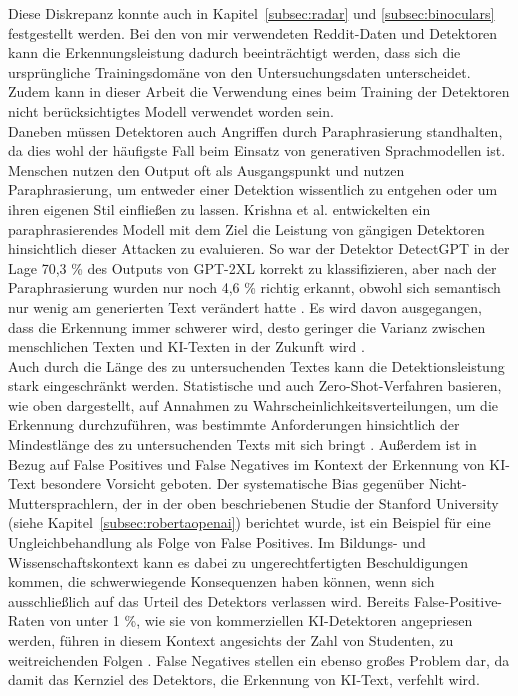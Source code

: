 Diese Diskrepanz konnte auch in Kapitel~\ref{subsec:radar} und \ref{subsec:binoculars} festgestellt werden. Bei den von mir verwendeten Reddit-Daten und Detektoren kann die Erkennungsleistung dadurch beeinträchtigt werden, dass sich die ursprüngliche Trainingsdomäne von den Untersuchungsdaten unterscheidet. Zudem kann in dieser Arbeit die Verwendung eines beim Training der Detektoren nicht berücksichtigtes Modell verwendet worden sein. \\
Daneben müssen Detektoren auch Angriffen durch Paraphrasierung standhalten, da dies wohl der häufigste Fall beim Einsatz von generativen Sprachmodellen ist. Menschen nutzen den Output oft als Ausgangspunkt und nutzen Paraphrasierung, um entweder einer Detektion wissentlich zu entgehen oder um ihren eigenen Stil einfließen zu lassen. Krishna et al. \autocite{krishna2023paraphrasingevadesdetectorsaigenerated} entwickelten ein paraphrasierendes Modell mit dem Ziel die Leistung von gängigen Detektoren hinsichtlich dieser Attacken zu evaluieren. So war der Detektor DetectGPT in der Lage 70,3 \% des Outputs von GPT-2XL korrekt zu klassifizieren, aber nach der Paraphrasierung wurden nur noch 4,6 \% richtig erkannt, obwohl sich semantisch nur wenig am generierten Text verändert hatte \autocite{krishna2023paraphrasingevadesdetectorsaigenerated}. Es wird davon ausgegangen, dass die Erkennung immer schwerer wird, desto geringer die Varianz zwischen menschlichen Texten und KI-Texten in der Zukunft wird \autocite{sadasivan2025aigeneratedtextreliablydetected}. \\
Auch durch die Länge des zu untersuchenden Textes kann die Detektionsleistung stark eingeschränkt werden. Statistische und auch Zero-Shot-Verfahren basieren, wie oben dargestellt, auf Annahmen zu Wahrscheinlichkeitsverteilungen, um die Erkennung durchzuführen, was bestimmte Anforderungen hinsichtlich der Mindestlänge des zu untersuchenden Texts mit sich bringt \autocite{bao2024fastdetectgptefficientzeroshotdetection}.
Außerdem ist in Bezug auf False Positives und False Negatives im Kontext der Erkennung von KI-Text besondere Vorsicht geboten. Der systematische Bias gegenüber Nicht-Muttersprachlern, der in der oben beschriebenen Studie der Stanford University (siehe Kapitel~\ref{subsec:robertaopenai}) berichtet wurde, ist ein Beispiel für eine Ungleichbehandlung als Folge von False Positives. Im Bildungs- und Wissenschaftskontext kann es dabei zu ungerechtfertigten Beschuldigungen kommen, die schwerwiegende Konsequenzen haben können, wenn sich ausschließlich auf das Urteil des Detektors verlassen wird. Bereits False-Positive-Raten von unter 1 \%, wie sie von kommerziellen KI-Detektoren angepriesen werden, führen in diesem Kontext angesichts der Zahl von Studenten, zu weitreichenden Folgen \autocite{pudasaini2026aigeneratedtextdetectionfails}. False Negatives stellen ein ebenso großes Problem dar, da damit das Kernziel des Detektors, die Erkennung von KI-Text, verfehlt wird.


